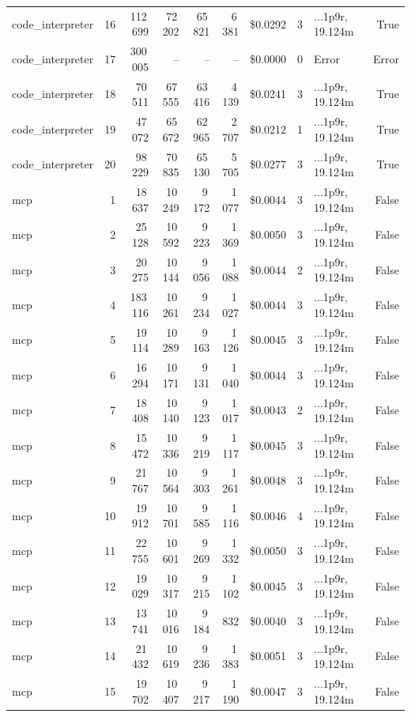 \documentclass[a4paper,11pt]{article}
\begin{document}
\begin{table}[H]
{\begin{tabular}{l r r r r r r r l r}
code\_interpreter & 16 & 112\,699 & 72\,202 & 65\,821 & 6\,381 & \$0.0292 & 3 & ...1p9r, 19.124m & True \\
code\_interpreter & 17 & 300\,005 & -- & -- & -- & \$0.0000 & 0 & Error & Error \\
code\_interpreter & 18 & 70\,511 & 67\,555 & 63\,416 & 4\,139 & \$0.0241 & 3 & ...1p9r, 19.124m & True \\
code\_interpreter & 19 & 47\,072 & 65\,672 & 62\,965 & 2\,707 & \$0.0212 & 1 & ...1p9r, 19.124m & True \\
code\_interpreter & 20 & 98\,229 & 70\,835 & 65\,130 & 5\,705 & \$0.0277 & 3 & ...1p9r, 19.124m & True \\
\midrule
mcp & 1 & 18\,637 & 10\,249 & 9\,172 & 1\,077 & \$0.0044 & 3 & ...1p9r, 19.124m & False \\
mcp & 2 & 25\,128 & 10\,592 & 9\,223 & 1\,369 & \$0.0050 & 3 & ...1p9r, 19.124m & False \\
mcp & 3 & 20\,275 & 10\,144 & 9\,056 & 1\,088 & \$0.0044 & 2 & ...1p9r, 19.124m & False \\
mcp & 4 & 183\,116 & 10\,261 & 9\,234 & 1\,027 & \$0.0044 & 3 & ...1p9r, 19.124m & False \\
mcp & 5 & 19\,114 & 10\,289 & 9\,163 & 1\,126 & \$0.0045 & 3 & ...1p9r, 19.124m & False \\
mcp & 6 & 16\,294 & 10\,171 & 9\,131 & 1\,040 & \$0.0044 & 3 & ...1p9r, 19.124m & False \\
mcp & 7 & 18\,408 & 10\,140 & 9\,123 & 1\,017 & \$0.0043 & 2 & ...1p9r, 19.124m & False \\
mcp & 8 & 15\,472 & 10\,336 & 9\,219 & 1\,117 & \$0.0045 & 3 & ...1p9r, 19.124m & False \\
mcp & 9 & 21\,767 & 10\,564 & 9\,303 & 1\,261 & \$0.0048 & 3 & ...1p9r, 19.124m & False \\
mcp & 10 & 19\,912 & 10\,701 & 9\,585 & 1\,116 & \$0.0046 & 4 & ...1p9r, 19.124m & False \\
mcp & 11 & 22\,755 & 10\,601 & 9\,269 & 1\,332 & \$0.0050 & 3 & ...1p9r, 19.124m & False \\
mcp & 12 & 19\,029 & 10\,317 & 9\,215 & 1\,102 & \$0.0045 & 3 & ...1p9r, 19.124m & False \\
mcp & 13 & 13\,741 & 10\,016 & 9\,184 & 832 & \$0.0040 & 3 & ...1p9r, 19.124m & False \\
mcp & 14 & 21\,432 & 10\,619 & 9\,236 & 1\,383 & \$0.0051 & 3 & ...1p9r, 19.124m & False \\
mcp & 15 & 19\,702 & 10\,407 & 9\,217 & 1\,190 & \$0.0047 & 3 & ...1p9r, 19.124m & False \\

\end{tabular}}
\end{table}
\end{document}
